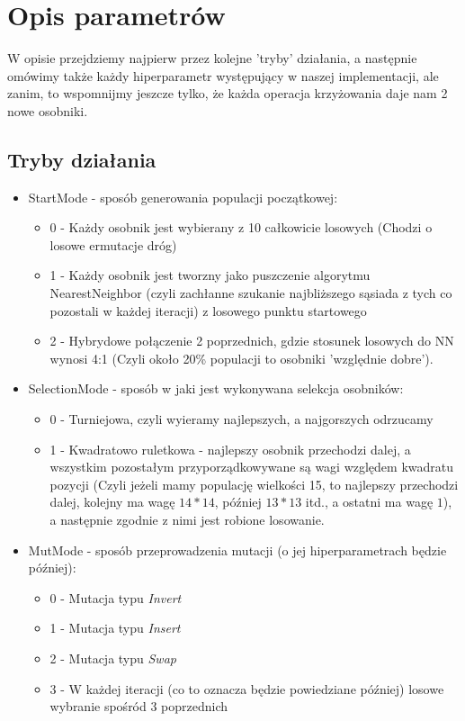 \documentclass{article}
\begin{document}
\section{Opis parametrów}
W opisie przejdziemy najpierw przez kolejne 'tryby' działania, a następnie omówimy także każdy hiperparametr występujący w naszej implementacji, ale zanim, to wspomnijmy jeszcze tylko, że każda operacja krzyżowania daje nam 2 nowe osobniki.

\subsection{Tryby działania}
\begin{itemize}
	\item StartMode - sposób generowania populacji początkowej:
		\begin{itemize}
			\item 0 - Każdy osobnik jest wybierany z 10 całkowicie losowych (Chodzi o losowe ermutacje dróg)
			\item 1 - Każdy osobnik jest tworzny jako puszczenie algorytmu NearestNeighbor (czyli zachłanne szukanie najbliższego sąsiada z tych co pozostali w każdej iteracji) z losowego punktu startowego
			\item 2 - Hybrydowe połączenie 2 poprzednich, gdzie stosunek losowych do NN wynosi 4:1 (Czyli około 20\% populacji to osobniki 'względnie dobre').
		\end{itemize}

	\item SelectionMode - sposób w jaki jest wykonywana selekcja osobników:
		\begin{itemize}
			\item 0 - Turniejowa, czyli wyieramy najlepszych, a najgorszych odrzucamy
			\item 1 - Kwadratowo ruletkowa - najlepszy osobnik przechodzi dalej, a wszystkim pozostałym przyporządkowywane są wagi względem kwadratu pozycji (Czyli jeżeli mamy populację wielkości 15, to najlepszy przechodzi dalej, kolejny ma wagę $14*14$, później $13*13$ itd., a ostatni ma wagę $1$), a następnie zgodnie z nimi jest robione losowanie.
		\end{itemize}

	\item MutMode - sposób przeprowadzenia mutacji (o jej hiperparametrach będzie później):
		\begin{itemize}
			\item 0 - Mutacja typu \textit{Invert}
			\item 1 - Mutacja typu \textit{Insert}
			\item 2 - Mutacja typu \textit{Swap}
			\item 3 - W każdej iteracji (co to oznacza będzie powiedziane później) losowe wybranie spośród 3 poprzednich
		\end{itemize}


\end{itemize}
\end{document}
